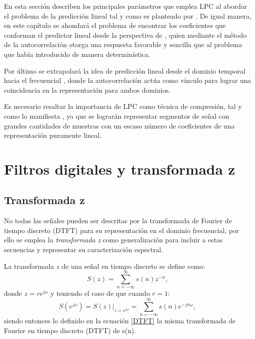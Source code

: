 En esta sección describen los principales parámetros que emplea LPC al abordar el problema de la predicción lineal tal y como es planteado por \cite{Vaidyanathan2008}.  De igual manera, en este capítulo se ahondará el problema de encontrar los coeficientes que conforman el predictor lineal desde la perspectiva de \cite{Rabiner1978,Rabiner1993}, quien mediante el método de la autocorrelación otorga una respuesta favorable y sencilla que al problema que \cite{Makhoul1975} había introducido de manera determinística.

Por último se extrapolará la idea de predicción lineal desde el dominio temporal hacia el frecuencial \cite[]{Makhoul1975c,Makhoul1973}, donde la autocorrelación actúa como vínculo para lograr una coincidencia en la representación para ambos dominios.

Es necesario resaltar la importancia de LPC como técnica de compresión, tal y como lo manifiesta \cite{Gersho1992}, ya que se lograrán representar segmentos de señal con grandes cantidades de muestras con un escaso número de coeficientes de una representación puramente lineal.

\section{Filtros digitales y transformada z}
\subsection{Transformada z}
No todas las señales pueden ser descritas por la transformada de Fourier de tiempo discreto (DTFT) para su representación en el dominio frecuencial, por ello se emplea la \emph{transformada z} como generalización para incluir a estas secuencias y representar su caracterización espectral.

La transformada $z$ de una señal en tiempo discreto se define como:
\begin{equation} \label{transf_z}
		S(z)= \sum_{n=-\infty}^{\infty}s(n)z^{-n},
\end{equation}
donde $z=re^{j\omega}$ y teniendo el caso de que cuando $r=1$:
\begin{equation}\label{DTFT}
S(e^{j\omega})=S(z)|_{z=e^{j\omega}} = \sum_{n=-\infty}^{\infty} s(n)e^{-jn\omega},
\end{equation}
siendo entonces lo definido en la ecuación \eqref{DTFT} la misma transformada de Fourier en tiempo discreto (DTFT) de s(n).

